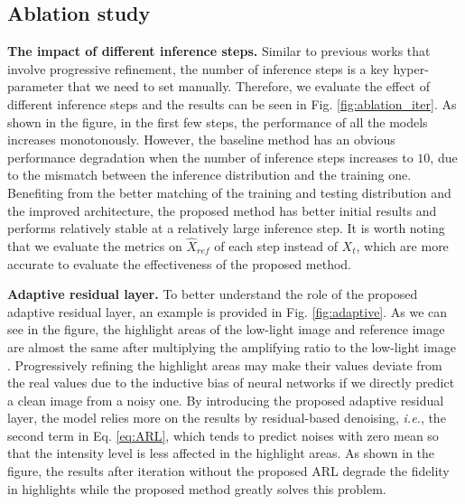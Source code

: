 \documentclass[10pt,twocolumn,letterpaper]{article}
\def\ie{\textit{i.e.}}
\newcommand{\para}[1]{\noindent\textbf{#1}}
\begin{document}
\subsection{Ablation study}
\vspace{-0.1cm}
\para{The impact of different inference steps.} Similar to previous works that involve progressive refinement, the number of inference steps is a key hyper-parameter that we need to set manually. Therefore, we evaluate the effect of different inference steps and the results can be seen in Fig. \ref{fig:ablation_iter}. As shown in the figure, in the first few steps, the performance of all the models increases monotonously. However, the baseline method has an obvious performance degradation when the number of inference steps increases to $10$, due to the mismatch between the inference distribution and the training one. Benefiting from the better matching of the training and testing distribution and the improved architecture, the proposed method has better initial results and performs relatively stable at a relatively large inference step. It is worth noting that we evaluate the metrics on $\hat{X}_{ref}$ of each step instead of $X_{t}$, which are more accurate to evaluate the effectiveness of the proposed method.

\noindent\textbf{Adaptive residual layer.} To better understand the role of the proposed adaptive residual layer, an example is provided in Fig. \ref{fig:adaptive}. As we can see in the figure, the highlight areas of the low-light image and reference image are almost the same after multiplying the amplifying ratio to the low-light image \cite{huang2022towards}. Progressively refining the highlight areas may make their values deviate from the real values due to the inductive bias of neural networks if we directly predict a clean image from a noisy one. By introducing the proposed adaptive residual layer, the model relies more on the results by residual-based denoising, \ie, the second term in Eq. \ref{eq:ARL}, which tends to predict noises with zero mean so that the intensity level is less affected in the highlight areas. As shown in the figure, the results after iteration without the proposed ARL degrade the fidelity in highlights while the proposed method greatly solves this problem.

\vspace{-0.1cm}
\end{document}
